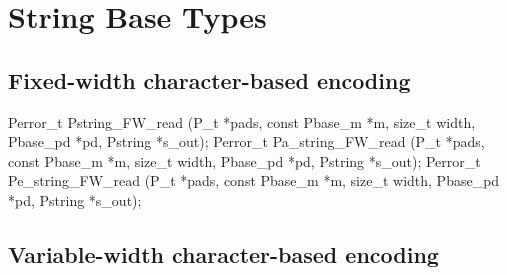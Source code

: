 \section{String Base Types}

\subsection{Fixed-width character-based encoding}

\aedBegin{}
\aedEnd{}

\begin{tinycodeaux}{\leftmargin=0in}
Perror_t Pstring_FW_read   (P_t *pads, const Pbase_m *m, size_t width,
			    Pbase_pd *pd, Pstring *s_out);
Perror_t Pa_string_FW_read (P_t *pads, const Pbase_m *m, size_t width,
			    Pbase_pd *pd, Pstring *s_out);
Perror_t Pe_string_FW_read (P_t *pads, const Pbase_m *m, size_t width,
			    Pbase_pd *pd, Pstring *s_out);
\end{tinycodeaux}

\subsection{Variable-width character-based encoding}

\aedBegin{}
\aedEnd{}

